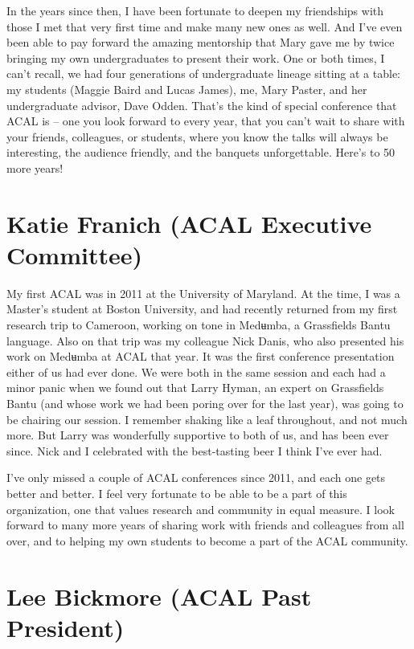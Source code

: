 \documentclass[output=paper]{langscibook}
\begin{document}
In the years since then, I have been fortunate to deepen my friendships with those I met that very first time and make many new ones as well. And I’ve even been able to pay forward the amazing mentorship that Mary gave me by twice bringing my own undergraduates to present their work. One or both times, I can’t recall, we had four generations of undergraduate lineage sitting at a table: my students (Maggie Baird and Lucas James), me, Mary Paster, and her undergraduate advisor, Dave Odden. 
That’s the kind of special conference that ACAL is -- one you look forward to every year, that you can’t wait to share with your friends, colleagues, or students, where you know the talks will always be interesting, the audience friendly, and the banquets unforgettable. Here’s to 50 more years! 

\section*{Katie Franich (ACAL Executive Committee)}

My first ACAL was in 2011 at the University of Maryland. At the time, I was a Master’s student at Boston University, and had recently returned from my first research trip to Cameroon, working on tone in Medʉmba, a Grassfields Bantu language. Also on that trip was my colleague Nick Danis, who also presented his work on Medʉmba at ACAL that year. It was the first conference presentation either of us had ever done. We were both in the same session and each had a minor panic when we found out that Larry Hyman, an expert on Grassfields Bantu (and whose work we had been poring over for the last year), was going to be chairing our session. I remember shaking like a leaf throughout, and not much more. But Larry was wonderfully supportive to both of us, and has been ever since. Nick and I celebrated with the best-tasting beer I think I’ve ever had.

I’ve only missed a couple of ACAL conferences since 2011, and each one gets better and better. I feel very fortunate to be able to be a part of this organization, one that values research and community in equal measure. I look forward to many more years of sharing work with friends and colleagues from all over, and to helping my own students to become a part of the ACAL community.

\section*{Lee Bickmore (ACAL Past President)}
\end{document}
